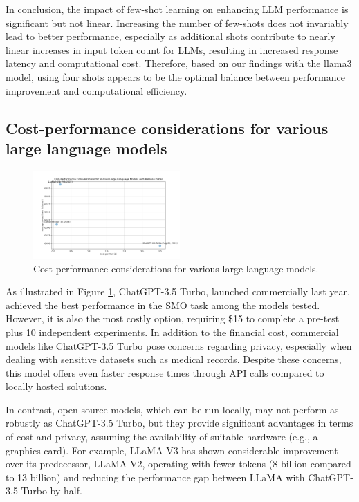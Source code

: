 \documentclass{ieeeaccess}
\begin{document}
In conclusion, the impact of few-shot learning on enhancing LLM performance is significant but not linear. Increasing the number of few-shots does not invariably lead to better performance, especially as additional shots contribute to nearly linear increases in input token count for LLMs, resulting in increased response latency and computational cost. Therefore, based on our findings with the llama3 model, using four shots appears to be the optimal balance between performance improvement and computational efficiency. 

\subsection{Cost-performance considerations for various large language models}

\begin{figure}
\centering
\includegraphics[page=1,width=0.5\textwidth]{cost_performance.png}
\caption{Cost-performance considerations for various large language models. }
\label{fig.7}
\end{figure}

As illustrated in Figure \ref{fig.7}, ChatGPT-3.5 Turbo, launched commercially last year, achieved the best performance in the SMO task among the models tested. However, it is also the most costly option, requiring \$15 to complete a pre-test plus 10 independent experiments. In addition to the financial cost, commercial models like ChatGPT-3.5 Turbo pose concerns regarding privacy, especially when dealing with sensitive datasets such as medical records. Despite these concerns, this model offers even faster response times through API calls compared to locally hosted solutions.

In contrast, open-source models, which can be run locally, may not perform as robustly as ChatGPT-3.5 Turbo, but they provide significant advantages in terms of cost and privacy, assuming the availability of suitable hardware (e.g., a graphics card). For example, LLaMA V3 has shown considerable improvement over its predecessor, LLaMA V2, operating with fewer tokens (8 billion compared to 13 billion) and reducing the performance gap between LLaMA with ChatGPT-3.5 Turbo by half.
\end{document}
